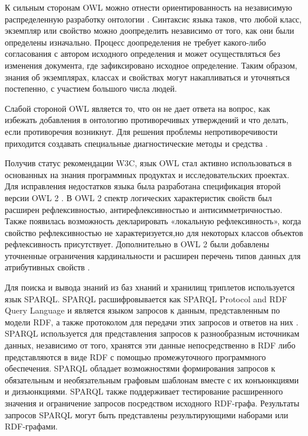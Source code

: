 К сильным сторонам OWL можно отнести ориентированность на независимую распределенную разработку онтологии \cite{bobillo2011fuzzy}. Синтаксис языка таков, что любой класс, экземпляр или свойство можно доопределить независимо от того, как они были определены изначально. Процесс доопределения не требует какого-либо согласования с автором исходного определения и может осуществляться без изменения документа, где зафиксировано исходное определение. Таким образом, знания об экземплярах, классах и свойствах могут накапливаться и уточняться постепенно, с участием большого числа людей.

Слабой стороной OWL является то, что он не дает ответа на вопрос, как избежать добавления в онтологию противоречивых утверждений и что делать, если противоречия возникнут. Для решения проблемы непротиворечивости приходится создавать специальные диагностические методы и средства \cite{deng2007measuring} .

Получив статус рекомендации W3C, язык OWL стал активно использоваться в основанных на знания программных продуктах и исследовательских проектах. Для исправления недостатков языка была разработана спецификация второй версии OWL 2 \cite{world2012owl} . В OWL 2 спектр логических характеристик свойств был расширен рефлексивностью, антирефлексивностью и антисимметричностью. Также появилась возможность декларировать «локальную рефлексивность», когда свойство рефлексивностью не характеризуется,но для некоторых классов объектов рефлексивность присутствует. Дополнительно в OWL 2 были добавлены уточненные ограничения кардинальности и расширен перечень типов данных для атрибутивных свойств \cite{golbreich2009owl}. 

Для поиска и вывода знаний из баз хнаний и хранилищ триплетов используется язык SPARQL. SPARQL  расшифровывается как SPARQL Protocol and RDF Query Language и является  языком запросов к данным, представленным по модели RDF, а также протоколом для передачи этих запросов и ответов на них \cite{prud2008sparql}. SPARQL используется для представления запросов к разнообразным источникам данных, независимо от того, хранятся эти данные непосредственно в RDF либо представляются в виде RDF с помощью промежуточного программного обеспечения. SPARQL обладает возможностями формирования запросов к обязательным и необязательным графовым шаблонам вместе с их конъюнкциями и дизъюнкциями. SPARQL также поддерживает тестирование расширенного значения и ограничение запросов посредством исходного RDF-графа. Результаты запросов SPARQL могут быть представлены результирующими наборами или RDF-графами.

